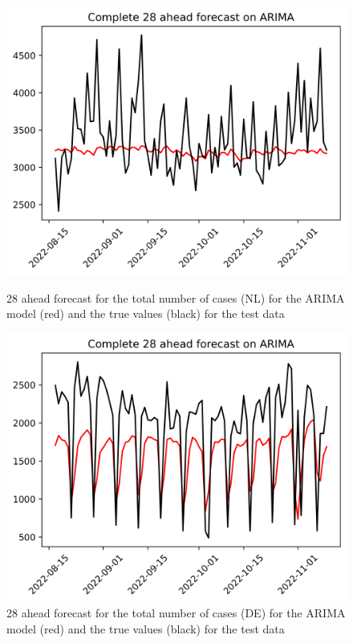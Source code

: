 \begin{figure}

\begin{minipage}{.45\textwidth}
  \centering
  \includegraphics[width=\linewidth]{pics/28_ah/Complete_28_ahead_ARIMA.png}
  \caption{28 ahead forecast for the total number of cases (NL) for the ARIMA model (red) and the true values (black) for the test data}
  \label{fig:tot_cases_fc_28_ARIMA}
\end{minipage}
\begin{minipage}{.45\textwidth}
  \centering
  \includegraphics[width=\linewidth]{pics/28_ah/DE_Complete_28_ahead_ARIMA.png}
  \caption{28 ahead forecast for the total number of cases (DE) for the ARIMA model (red) and the true values (black) for the test data}
  \label{fig:tot_cases_fc_28_ARIMA_DE}
\end{minipage}

\end{figure}
